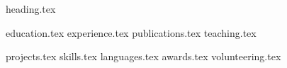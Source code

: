 \documentclass[letterpaper,11pt]{article}
\begin{document}
{heading.tex}

{education.tex}
{experience.tex}
{publications.tex}
{teaching.tex}

\pagebreak

{projects.tex}
\sidebyside
    {{skills.tex}}
    {{languages.tex}}
{awards.tex}
{volunteering.tex}
\end{document}
